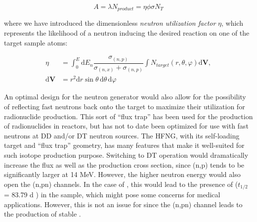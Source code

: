 \documentclass[5p]{elsarticle}
\newcommand{\pp}[1]{\left( #1\right)}
\begin{document}
\begin{equation}
A = \lambda N_{product} = \eta \phi \sigma N_{T}
\end{equation}

where we have introduced the dimensionless \emph{neutron utilization factor} $\eta$, which represents the likelihood of a neutron inducing the desired reaction on one of the target sample atoms:





\begin{align}
\eta &= \int_0^E \text{d}E_n \dfrac{\sigma_{(n,p)}}{\sigma_{(n,x)} + \sigma_{(n,p)}} \int N_{target} \pp{r,\theta,\varphi} \text{d}\mathbf{V}, \nonumber\\
\text{d}\mathbf{V} &= r^2 \text{d}r \sin{\theta}\, \text{d}\theta\, \text{d}\varphi 
\end{align}


An optimal design for the neutron generator would also allow for the possibility of reflecting fast neutrons back onto the target to maximize their utilization for radionuclide production.
 This sort of \enquote{flux trap} has been used for the production of radionuclides in reactors, but has not to date been optimized for use with fast neutrons  at DD and/or DT neutron sources.
 The HFNG, with its self-loading target and \enquote{flux trap} geometry, has many features that make it well-suited for such isotope production purpose.
 Switching to DT operation would dramatically increase the flux as well as the production cross section, since (n,p) tends to be significantly larger at 14 MeV.
 However, the higher neutron energy would also open the (n,pn) channels.
 In the case of , this would lead to the presence of  ($t_{1/2}$ = 83.79 d \cite{Wu2000}) in the sample, which might pose some concerns for medical applications.
 However, this is not an issue for  since the (n,pn) channel leads to the production of stable .
 
\end{document}
